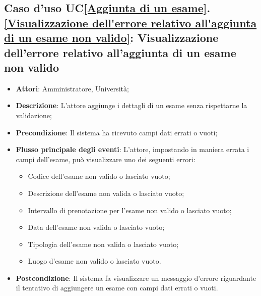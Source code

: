 \subsection{Caso d'uso UC\ref{Aggiunta di un esame}.\ref{Visualizzazione dell'errore relativo all'aggiunta di un esame non valido}: Visualizzazione dell'errore relativo all'aggiunta di un esame non valido}
\begin{itemize}
	\item \textbf{Attori}: Amministratore, Università;
	\item \textbf{Descrizione}: L'attore aggiunge i dettagli di un esame senza rispettarne la validazione;
	
	\item \textbf{Precondizione}: Il sistema ha ricevuto campi dati errati o vuoti;
	\item \textbf{Flusso principale degli eventi}: L'attore, impostando in maniera errata i campi dell'esame, può visualizzare uno dei seguenti errori:
	\begin{itemize}
		\item Codice dell'esame non valido o lasciato vuoto;
		\item Descrizione dell'esame non valida o lasciato vuoto;
		\item Intervallo di prenotazione per l'esame non valido o lasciato vuoto;
		\item Data dell'esame non valida o lasciato vuoto;
		\item Tipologia dell'esame non valida o lasciato vuoto;
		\item Luogo d'esame non valido o lasciato vuoto.
	\end{itemize}
	\item \textbf{Postcondizione}: Il sistema fa visualizzare un messaggio d'errore riguardante il tentativo di aggiungere un esame con campi dati errati o vuoti.
	
\end{itemize}




